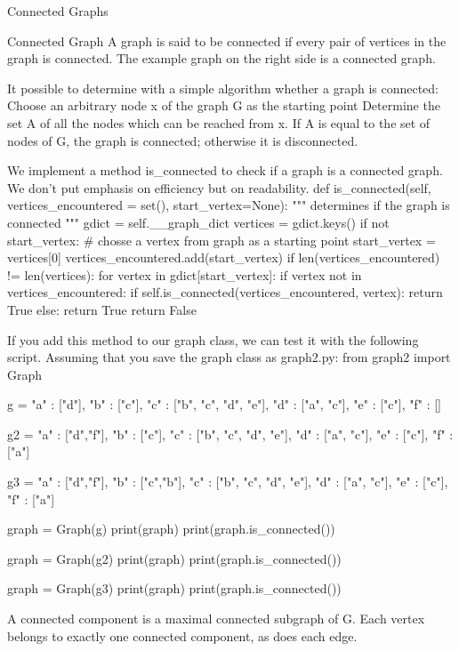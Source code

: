 Connected Graphs

Connected Graph A graph is said to be connected if every pair of vertices in the graph is connected. The example graph on the right side is a connected graph. 

It possible to determine with a simple algorithm whether a graph is connected:
Choose an arbitrary node x of the graph G as the starting point
Determine the set A of all the nodes which can be reached from x.
If A is equal to the set of nodes of G, the graph is connected; otherwise it is disconnected.

We implement a method is_connected to check if a graph is a connected graph. We don't put emphasis on efficiency but on readability.
    def is_connected(self, 
                     vertices_encountered = set(), 
                     start_vertex=None):
        """ determines if the graph is connected """
        gdict = self.__graph_dict        
        vertices = gdict.keys() 
        if not start_vertex:
            # chosse a vertex from graph as a starting point
            start_vertex = vertices[0]
        vertices_encountered.add(start_vertex)
        if len(vertices_encountered) != len(vertices):
            for vertex in gdict[start_vertex]:
                if vertex not in vertices_encountered:
                    if self.is_connected(vertices_encountered, vertex):
                        return True
        else:
            return True
        return False


If you add this method to our graph class, we can test it with the following script. Assuming that you save the graph class as graph2.py:
from graph2 import Graph

g = { "a" : ["d"],
      "b" : ["c"],
      "c" : ["b", "c", "d", "e"],
      "d" : ["a", "c"],
      "e" : ["c"],
      "f" : []
}

g2 = { "a" : ["d","f"],
       "b" : ["c"],
       "c" : ["b", "c", "d", "e"],
       "d" : ["a", "c"],
       "e" : ["c"],
       "f" : ["a"]
}

g3 = { "a" : ["d","f"],
       "b" : ["c","b"],
       "c" : ["b", "c", "d", "e"],
       "d" : ["a", "c"],
       "e" : ["c"],
       "f" : ["a"]
}


graph = Graph(g)
print(graph)
print(graph.is_connected())

graph = Graph(g2)
print(graph)
print(graph.is_connected())

graph = Graph(g3)
print(graph)
print(graph.is_connected())


A connected component is a maximal connected subgraph of G. Each vertex belongs to exactly one connected component, as does each edge. 

